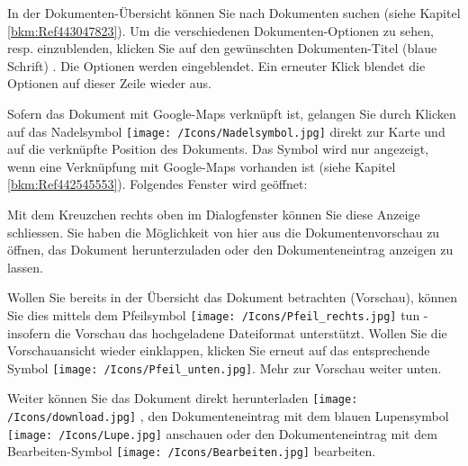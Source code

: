 In der Dokumenten-Übersicht können Sie nach Dokumenten suchen (siehe Kapitel \ref{bkm:Ref443047823}). Um die verschiedenen Dokumenten-Optionen zu sehen, resp. einzublenden, klicken Sie auf den gewünschten Dokumenten-Titel (blaue Schrift) . Die Optionen werden eingeblendet. Ein erneuter Klick blendet die Optionen auf dieser Zeile wieder aus. \newline

Sofern das Dokument mit Google-Maps verknüpft ist, gelangen Sie durch Klicken auf das Nadelsymbol \texttt{[image: /Icons/Nadelsymbol.jpg]}  direkt zur Karte und auf die verknüpfte Position des Dokuments. Das Symbol wird nur angezeigt, wenn eine Verknüpfung mit Google-Maps vorhanden ist (siehe Kapitel \ref{bkm:Ref442545553}). Folgendes Fenster wird geöffnet:

\begin{figure}[H]
\end{figure}

Mit dem Kreuzchen rechts oben im Dialogfenster können Sie diese Anzeige schliessen. Sie haben die Möglichkeit von hier aus die Dokumentenvorschau zu öffnen, das Dokument herunterzuladen oder den Dokumenteneintrag anzeigen zu lassen. \newline

Wollen Sie bereits in der Übersicht das Dokument betrachten (Vorschau), können Sie dies mittels dem Pfeilsymbol \texttt{[image: /Icons/Pfeil\_rechts.jpg]}  tun - insofern die Vorschau das hochgeladene Dateiformat unterstützt. Wollen Sie die Vorschauansicht wieder einklappen, klicken Sie erneut auf das entsprechende Symbol \texttt{[image: /Icons/Pfeil\_unten.jpg]}. Mehr zur Vorschau weiter unten. \newline

Weiter können Sie das Dokument direkt herunterladen \texttt{[image: /Icons/download.jpg]} , den Dokumenteneintrag mit dem blauen Lupensymbol \texttt{[image: /Icons/Lupe.jpg]}  anschauen oder den Dokumenteneintrag mit dem Bearbeiten-Symbol \texttt{[image: /Icons/Bearbeiten.jpg]}  bearbeiten. \newline

